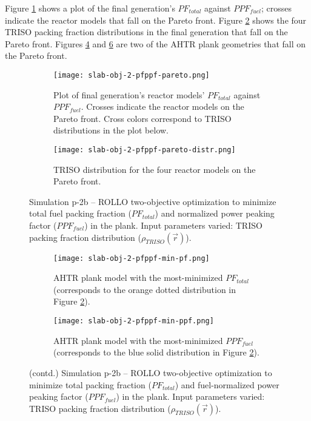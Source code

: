 Figure \ref{fig:slab-obj-2-pfppf-pareto} shows a plot of the final generation's 
$PF_{total}$ against $PPF_{fuel}$; crosses indicate the reactor models that fall on 
the Pareto front.
Figure \ref{fig:slab-obj-2-pfppf-pareto-distr} shows the four TRISO packing fraction 
distributions in the final generation that fall on the Pareto front. 
Figures \ref{fig:slab-obj-2-pfppf-min-pf} and \ref{fig:slab-obj-2-pfppf-min-ppf} 
are two of the \gls{AHTR} plank geometries that fall on the Pareto front. 
\begin{figure}[htbp!]
    \centering
    \begin{subfigure}{\textwidth}
        \texttt{[image: slab-obj-2-pfppf-pareto.png]}
        \caption{Plot of final generation's reactor models' $PF_{total}$ against 
        $PPF_{fuel}$. 
        Crosses indicate the reactor models on the Pareto front. Cross colors correspond  
        to TRISO distributions in the plot below.}
        \label{fig:slab-obj-2-pfppf-pareto} 
    \end{subfigure}
    \begin{subfigure}{\textwidth}
        \texttt{[image: slab-obj-2-pfppf-pareto-distr.png]}
        \caption{TRISO distribution for the four reactor models on the Pareto front.}
        \label{fig:slab-obj-2-pfppf-pareto-distr} 
    \end{subfigure}
    \caption{Simulation p-2b -- ROLLO two-objective optimization to minimize total fuel 
    packing fraction ($PF_{total}$) and normalized power peaking factor ($PPF_{fuel}$) 
    in the plank. 
    Input parameters varied: TRISO packing fraction distribution 
    ($\rho_{TRISO}(\vec{r})$).}
    \label{fig:slab-obj-2-pfppf}
\end{figure}
\begin{figure}[htbp!]
    \ContinuedFloat
    \begin{subfigure}{\textwidth}
        \texttt{[image: slab-obj-2-pfppf-min-pf.png]}
        \caption{\gls{AHTR} plank model with the most-minimized $PF_{total}$
        (corresponds to the orange dotted distribution in Figure 
        \ref{fig:slab-obj-2-pfppf-pareto-distr}).}
        \label{fig:slab-obj-2-pfppf-min-pf} 
    \end{subfigure}
    \begin{subfigure}{\textwidth}
        \texttt{[image: slab-obj-2-pfppf-min-ppf.png]}
        \caption{\gls{AHTR} plank model with the most-minimized $PPF_{fuel}$
        (corresponds to the blue solid distribution in Figure 
        \ref{fig:slab-obj-2-pfppf-pareto-distr}).}
        \label{fig:slab-obj-2-pfppf-min-ppf} 
    \end{subfigure}
    \caption{(contd.) Simulation p-2b -- ROLLO two-objective optimization to minimize 
    total packing fraction ($PF_{total}$) and fuel-normalized power peaking factor 
    ($PPF_{fuel}$) in the plank. 
    Input parameters varied: TRISO packing fraction distribution ($\rho_{TRISO}(\vec{r})$).}
\end{figure}

